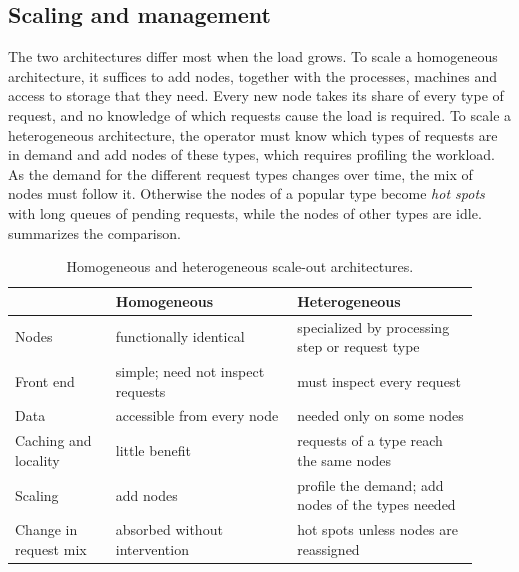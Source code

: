 \documentclass[../main.tex]{subfiles}
\begin{document}
\subsection{Scaling and management}

The two architectures differ most when the load grows.  To scale a homogeneous architecture, it suffices to add nodes,
together with the processes, machines and access to storage that they need.
Every new node takes its share of every type of request, and no knowledge of which requests
cause the load is required.  To scale a heterogeneous architecture, the
operator must know which types of requests are in demand and add nodes of
these types, which requires profiling the workload.  As the
demand for the different request types changes over time, the mix of nodes
must follow it.  Otherwise the nodes of a popular type become \emph{hot
spots} with long queues of pending requests, while the nodes of other types
are idle.   summarizes the comparison.

\begin{table}[htbp]
  \centering
  \caption{Homogeneous and heterogeneous scale-out architectures.}
  \label{tab:l16-arch}
  \small
  \begin{tabular}{@{}>{\raggedright\arraybackslash}p{0.2\linewidth}>{\raggedright\arraybackslash}p{0.36\linewidth}>{\raggedright\arraybackslash}p{0.36\linewidth}@{}}
    \toprule
    & Homogeneous & Heterogeneous \\
    \midrule
    Nodes & functionally identical & specialized by processing step or
      request type \\
    Front end & simple; need not inspect requests & must inspect every
      request \\
    Data & accessible from every node & needed only on some nodes \\
    Caching and locality & little benefit & requests of a type reach the
      same nodes \\
    Scaling & add nodes & profile the demand; add nodes of the types
      needed \\
    Change in request mix & absorbed without intervention & hot spots
      unless nodes are reassigned \\
    \bottomrule
  \end{tabular}
\end{table}
\end{document}
